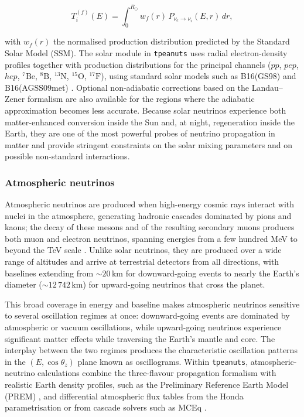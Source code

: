\begin{equation}
  T_i^{(f)}(E) = \int_0^{R_\odot} w_f(r)\, P_{\nu_e\to\nu_i}(E,r)\, dr,
\end{equation}

with \(w_f(r)\) the normalised production distribution predicted by the Standard Solar Model (SSM). The solar module in \texttt{tpeanuts} uses radial electron-density profiles together with production distributions for the principal channels (\(pp\), \(pep\), \(hep\), \({}^7\mathrm{Be}\), \({}^8\mathrm{B}\), \({}^{13}\mathrm{N}\), \({}^{15}\mathrm{O}\), \({}^{17}\mathrm{F}\)), using standard solar models such as B16(GS98) and B16(AGSS09met) \parencite{Vinyoles2017}. Optional non-adiabatic corrections based on the Landau--Zener formalism \parencite{Parke1986} are also available for the regions where the adiabatic approximation becomes less accurate. Because solar neutrinos experience both matter-enhanced conversion inside the Sun and, at night, regeneration inside the Earth, they are one of the most powerful probes of neutrino propagation in matter and provide stringent constraints on the solar mixing parameters and on possible non-standard interactions.

\subsubsection{Atmospheric neutrinos}

Atmospheric neutrinos are produced when high-energy cosmic rays interact with nuclei in the atmosphere, generating hadronic cascades dominated by pions and kaons; the decay of these mesons and of the resulting secondary muons produces both muon and electron neutrinos, spanning energies from a few hundred MeV to beyond the TeV scale \parencite{Honda2007}. Unlike solar neutrinos, they are produced over a wide range of altitudes and arrive at terrestrial detectors from all directions, with baselines extending from \(\sim20\,\mathrm{km}\) for downward-going events to nearly the Earth's diameter (\(\sim12\,742\,\mathrm{km}\)) for upward-going neutrinos that cross the planet.

This broad coverage in energy and baseline makes atmospheric neutrinos sensitive to several oscillation regimes at once: downward-going events are dominated by atmospheric or vacuum oscillations, while upward-going neutrinos experience significant matter effects while traversing the Earth's mantle and core. The interplay between the two regimes produces the characteristic oscillation patterns in the \((E,\cos\theta_z)\) plane known as oscillograms. Within \texttt{tpeanuts}, atmospheric-neutrino calculations combine the three-flavour propagation formalism with realistic Earth density profiles, such as the Preliminary Reference Earth Model (PREM) \parencite{Dziewonski1981}, and differential atmospheric flux tables from the Honda parametrisation \parencite{Honda2007} or from cascade solvers such as MCEq \parencite{Fedynitch2015}.

